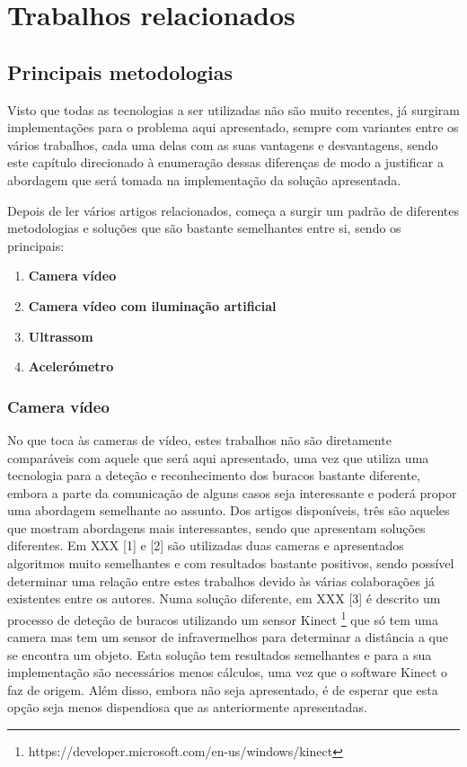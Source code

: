 \chapter{Trabalhos relacionados}
\label{cha:trabalhos_relacionados}

\section{Principais metodologias} %
\label{sec:principais_metodologias}

Visto que todas as tecnologias a ser utilizadas não são muito recentes, já surgiram implementações para o problema aqui apresentado, sempre com variantes entre os vários trabalhos, cada uma delas com as suas vantagens e desvantagens, sendo este capítulo direcionado à enumeração dessas diferenças de modo a justificar a abordagem que será tomada na implementação da solução apresentada.

Depois de ler vários artigos relacionados, começa a surgir um padrão de diferentes metodologias e soluções que são bastante semelhantes entre si, sendo os principais:
\begin{enumerate}
	
	\item \textbf{Camera vídeo}
	\item \textbf{Camera vídeo com iluminação artificial}
	\item \textbf{Ultrassom}
	\item \textbf{Acelerómetro}
\end{enumerate}

\subsection{Camera vídeo}
\label{subsec: camera_video}
No que toca às cameras de vídeo, estes trabalhos não são diretamente comparáveis com aquele que será aqui apresentado, uma vez que utiliza uma tecnologia para a deteção e reconhecimento dos buracos bastante diferente, embora a parte da comunicação de alguns casos seja interessante e poderá propor uma abordagem semelhante ao assunto. Dos artigos disponíveis, três são aqueles que mostram abordagens mais interessantes, sendo que apresentam soluções diferentes. Em {XXX} [1] e [2] são utilizadas duas cameras e apresentados algoritmos muito semelhantes e com resultados bastante positivos, sendo possível determinar uma relação entre estes trabalhos devido às várias colaborações já existentes entre os autores.
Numa solução diferente, em {XXX} [3] é descrito um processo de deteção de buracos utilizando um sensor Kinect \footnote{https://developer.microsoft.com/en-us/windows/kinect} que só tem uma camera mas tem um sensor de infravermelhos para determinar a distância a que se encontra um objeto. Esta solução tem resultados semelhantes e para a sua implementação são necessários menos cálculos, uma vez que o software Kinect o faz de origem. Além disso, embora não seja apresentado, é de esperar que esta opção seja menos dispendiosa que as anteriormente apresentadas.

